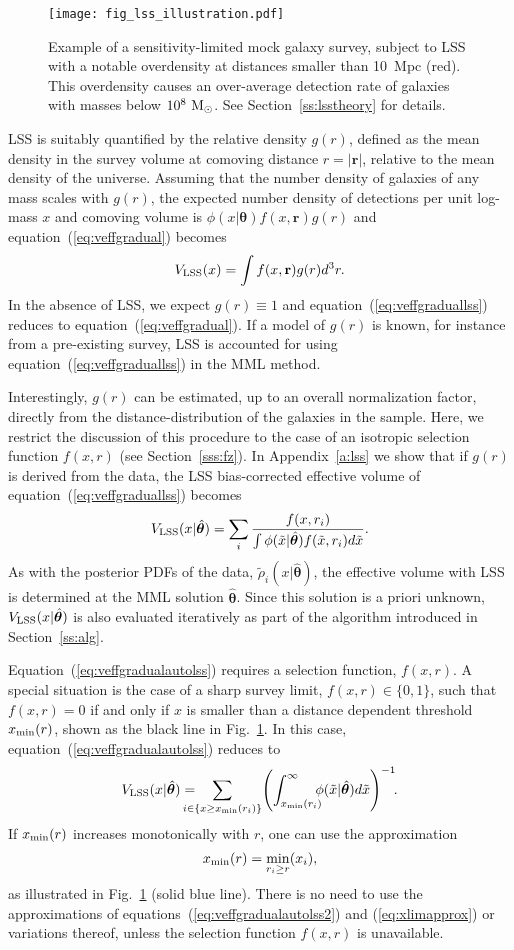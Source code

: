 \documentclass[a4paper,fleqn,usenatbib]{mnras}
\newcommand{\be}{\begin{equation}}
\newcommand{\ee}{\end{equation}}
\renewcommand{\r}{\mathbf{r}}
\newcommand{\msun}{{\rm M}_{\odot}}
\newcommand{\vefflss}{V_{\rm LSS}}%
\newcommand{\fig}[1]{Fig.~\ref{fig:#1}}
\newcommand{\eq}[1]{equation~(\ref{eq:#1})}
\newcommand{\Eq}[1]{Equation~(\ref{eq:#1})}
\renewcommand{\ss}[1]{Section~\ref{ss:#1}}
\renewcommand{\a}[1]{Appendix~\ref{a:#1}}
\newcommand{\para}{{\bm{\theta}}}
\begin{document}
\begin{figure}
\begin{center}
\texttt{[image: fig\_lss\_illustration.pdf]}\vspace{-4mm}
\caption{Example of a sensitivity-limited mock galaxy survey, subject to LSS with a notable overdensity at distances smaller than 10~Mpc (red). This overdensity causes an over-average detection rate of galaxies with masses below $10^8~\msun$. See \ss{lsstheory} for details.}\label{fig:lss_illustration}
\end{center}
\end{figure}

LSS is suitably quantified by the relative density $g(r)$, defined as the mean density in the survey volume at comoving distance $r=|\r|$, relative to the mean density of the universe. Assuming that the number density of galaxies of any mass scales with $g(r)$, the expected number density of detections per unit log-mass $x$ and comoving volume is $\phi(x|\para)f(x,\r)g(r)$ and \eq{veffgradual} becomes
%
\be\label{eq:veffgraduallss}
	\vefflss(x) = \int f(x,\r)g(r)d^3r.
\ee
%
In the absence of LSS, we expect $g(r)\equiv1$ and \eq{veffgraduallss} reduces to \eq{veffgradual}. If a model of $g(r)$ is known, for instance from a pre-existing survey, LSS is accounted for using \eq{veffgraduallss} in the MML method.

Interestingly, $g(r)$ can be estimated, up to an overall normalization factor, directly from the distance-distribution of the galaxies in the sample. Here, we restrict the discussion of this procedure to the case of an isotropic selection function $f(x,r)$ (see Section~\ref{sss:fz}). In \a{lss} we show that if $g(r)$ is derived from the data, the LSS bias-corrected effective volume of \eq{veffgraduallss} becomes
%
\be\label{eq:veffgradualautolss}
	\vefflss(x|\hat\para) = \sum_i\frac{f(x,r_i)}{\int\phi(\tilde x|\hat\para)f(\tilde x,r_i)d\tilde x}.
\ee
%
As with the posterior PDFs of the data, $\tilde\rho_i(x|\hat\para)$, the effective volume with LSS is determined at the MML solution $\hat\para$. Since this solution is a priori unknown, $\vefflss(x|\hat\para)$ is also evaluated iteratively as part of the algorithm introduced in \ss{alg}.

\Eq{veffgradualautolss} requires a selection function, $f(x,r)$. A special situation is the case of a sharp survey limit, $f(x,r)\in\{0,1\}$, such that $f(x,r)=0$ if and only if $x$ is smaller than a distance dependent threshold $x_{\rm min}(r)$, shown as the black line in \fig{lss_illustration}. In this case, \eq{veffgradualautolss} reduces to
%
\be\label{eq:veffgradualautolss2}
	\vefflss(x|\hat\para) = \!\!\!\!\!\!\!\sum_{i\in\{x\geq x_{\rm min}(r_i)\}}\!\left(\int_{x_{\rm min}(r_i)}^\infty\!\!\!\!\phi(\tilde x|\hat\para)d\tilde x\right)^{-1}\!\!.
\ee
%
If $x_{\rm min}(r)$ increases monotonically with $r$, one can use the approximation
%
\be\label{eq:xlimapprox}
	x_{\rm min}(r)=\min_{r_i\geq r}(x_i),
\ee
%
as illustrated in \fig{lss_illustration} (solid blue line). There is no need to use the approximations of equations~(\ref{eq:veffgradualautolss2}) and (\ref{eq:xlimapprox}) or variations thereof, unless the selection function $f(x,r)$ is unavailable.
\end{document}
